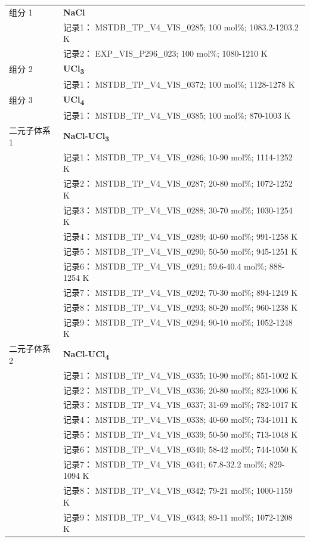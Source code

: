 \documentclass[12pt]{article}
\begin{document}
{\begin{longtable}[]{@{}
  >{\raggedright\arraybackslash}p{}
  >{\raggedright\arraybackslash}p{}@{}}
组分 1  & \textbf{NaCl} \\
 & 记录1： MSTDB\_TP\_V4\_VIS\_0285; 100 mol\%; 1083.2-1203.2 K \\
 & 记录2： EXP\_VIS\_P296\_023; 100 mol\%; 1080-1210 K  \\

组分 2  & \textbf{UCl\textsubscript{3}} \\
 & 记录1： MSTDB\_TP\_V4\_VIS\_0372; 100 mol\%; 1128-1278 K  \\

组分 3  & \textbf{UCl\textsubscript{4}} \\
 & 记录1： MSTDB\_TP\_V4\_VIS\_0385; 100 mol\%; 870-1003 K  \\

二元子体系 1  & \textbf{NaCl-UCl\textsubscript{3}} \\
 & 记录1： MSTDB\_TP\_V4\_VIS\_0286; 10-90 mol\%; 1114-1252 K \\
 & 记录2： MSTDB\_TP\_V4\_VIS\_0287; 20-80 mol\%; 1072-1252 K \\
 & 记录3： MSTDB\_TP\_V4\_VIS\_0288; 30-70 mol\%; 1030-1254 K \\
 & 记录4： MSTDB\_TP\_V4\_VIS\_0289; 40-60 mol\%; 991-1258 K \\
 & 记录5： MSTDB\_TP\_V4\_VIS\_0290; 50-50 mol\%; 945-1251 K \\
 & 记录6： MSTDB\_TP\_V4\_VIS\_0291; 59.6-40.4 mol\%; 888-1254 K \\
 & 记录7： MSTDB\_TP\_V4\_VIS\_0292; 70-30 mol\%; 894-1249 K \\
 & 记录8： MSTDB\_TP\_V4\_VIS\_0293; 80-20 mol\%; 960-1238 K \\
 & 记录9： MSTDB\_TP\_V4\_VIS\_0294; 90-10 mol\%; 1052-1248 K  \\

二元子体系 2  & \textbf{NaCl-UCl\textsubscript{4}} \\
 & 记录1： MSTDB\_TP\_V4\_VIS\_0335; 10-90 mol\%; 851-1002 K \\
 & 记录2： MSTDB\_TP\_V4\_VIS\_0336; 20-80 mol\%; 823-1006 K \\
 & 记录3： MSTDB\_TP\_V4\_VIS\_0337; 31-69 mol\%; 782-1017 K \\
 & 记录4： MSTDB\_TP\_V4\_VIS\_0338; 40-60 mol\%; 734-1011 K \\
 & 记录5： MSTDB\_TP\_V4\_VIS\_0339; 50-50 mol\%; 713-1048 K \\
 & 记录6： MSTDB\_TP\_V4\_VIS\_0340; 58-42 mol\%; 744-1050 K \\
 & 记录7： MSTDB\_TP\_V4\_VIS\_0341; 67.8-32.2 mol\%; 829-1094 K \\
 & 记录8： MSTDB\_TP\_V4\_VIS\_0342; 79-21 mol\%; 1000-1159 K \\
 & 记录9： MSTDB\_TP\_V4\_VIS\_0343; 89-11 mol\%; 1072-1208 K  \\


\end{longtable}}
\end{document}

